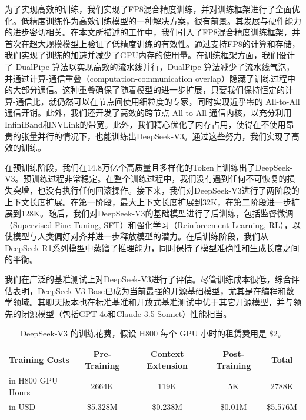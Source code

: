\documentclass[lang=cn,a4paper,newtx]{elegantpaper}
\newcommand{\dsviii}{DeepSeek-V3}
\begin{document}
为了实现高效的训练，我们实现了FP8混合精度训练，并对训练框架进行了全面优化。低精度训练作为高效训练模型的一种解决方案，很有前景。其发展与硬件能力的进步密切相关。在本文所描述的工作中，我们引入了FP8混合精度训练框架，并首次在超大规模模型上验证了低精度训练的有效性。通过支持FP8的计算和存储，我们实现了训练的加速并减少了GPU内存的使用量。在训练框架方面，我们设计了 DualPipe 算法以实现高效的流水线并行，DualPipe 算法减少了流水线气泡，并通过计算-通信重叠（computation-communication overlap）隐藏了训练过程中的大部分通信。这种重叠确保了随着模型的进一步扩展，只要我们保持恒定的计算-通信比，就仍然可以在节点间使用细粒度的专家，同时实现近乎零的 All-to-All 通信开销。此外，我们还开发了高效的跨节点 All-to-All 通信内核，以充分利用InfiniBand和NVLink的带宽。此外，我们精心优化了内存占用，使得在不使用昂贵的张量并行的情况下，也能训练出\dsviii{}。通过这些努力，我们实现了高效的训练。

在预训练阶段，我们在14.8万亿个高质量且多样化的Token上训练出了\dsviii{}。预训练过程非常稳定。在整个训练过程中，我们没有遇到任何不可恢复的损失突增，也没有执行任何回滚操作。接下来，我们对\dsviii{}进行了两阶段的上下文长度扩展。在第一阶段，最大上下文长度扩展到32K，在第二阶段进一步扩展到128K。随后，我们对\dsviii{}的基础模型进行了后训练，包括监督微调（Supervised Fine-Tuning, SFT）和强化学习（Reinforcement Learning, RL），以使模型与人类偏好对齐并进一步释放模型的潜力。在后训练阶段，我们从DeepSeek-R1系列模型中蒸馏了推理能力，同时保持了模型准确性和生成长度之间的平衡。

我们在广泛的基准测试上对\dsviii{}进行了评估。尽管训练成本很低，综合评估表明，\dsviii{}-Base已成为当前最强的开源基础模型，尤其是在编程和数学领域。其聊天版本也在标准基准和开放式基准测试中优于其它开源模型，并与领先的闭源模型（包括GPT-4o和Claude-3.5-Sonnet）性能相当。

\begin{table}[t]
    \centering
    \setlength{\tabcolsep}{6pt}
    \begin{tabular}{l | c c c | c}
        \toprule
        \textbf{Training Costs} & \textbf{Pre-Training} & \textbf{Context Extension} & \textbf{Post-Training} & \textbf{Total} \\
        \midrule
        in H800 GPU Hours & 2664K & 119K & 5K & 2788K \\
        in USD & \$5.328M & \$0.238M & \$0.01M & \$5.576M \\
        \bottomrule
    \end{tabular}
    \caption{
    \dsviii{} 的训练花费，假设 H800 每个 GPU 小时的租赁费用是 \$2。
    }
    \label{tab:cost}
\end{table}
\end{document}
